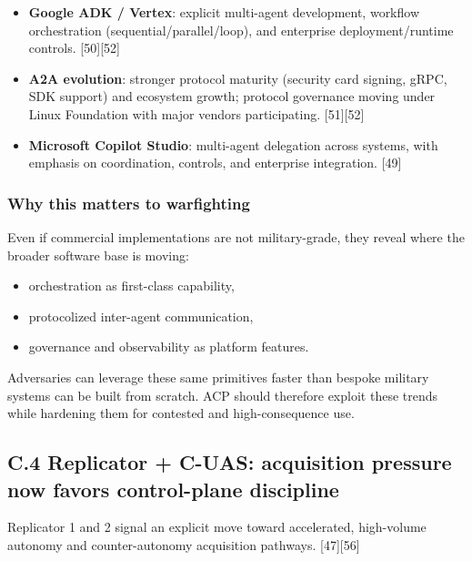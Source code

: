 \documentclass[
]{article}
\providecommand{\tightlist}{%
  \setlength{\itemsep}{0pt}\setlength{\parskip}{0pt}}
\begin{document}
\begin{itemize}
\tightlist
\item
  \textbf{Google ADK / Vertex}: explicit multi-agent development,
  workflow orchestration (sequential/parallel/loop), and enterprise
  deployment/runtime controls. {[}50{]}{[}52{]}
\item
  \textbf{A2A evolution}: stronger protocol maturity (security card
  signing, gRPC, SDK support) and ecosystem growth; protocol governance
  moving under Linux Foundation with major vendors participating.
  {[}51{]}{[}52{]}
\item
  \textbf{Microsoft Copilot Studio}: multi-agent delegation across
  systems, with emphasis on coordination, controls, and enterprise
  integration. {[}49{]}
\end{itemize}

\hypertarget{why-this-matters-to-warfighting}{%
\subsubsection{Why this matters to
warfighting}\label{why-this-matters-to-warfighting}}

Even if commercial implementations are not military-grade, they reveal
where the broader software base is moving:

\begin{itemize}
\tightlist
\item
  orchestration as first-class capability,
\item
  protocolized inter-agent communication,
\item
  governance and observability as platform features.
\end{itemize}

Adversaries can leverage these same primitives faster than bespoke
military systems can be built from scratch. ACP should therefore exploit
these trends while hardening them for contested and high-consequence
use.

\hypertarget{c.4-replicator-c-uas-acquisition-pressure-now-favors-control-plane-discipline}{%
\subsection{C.4 Replicator + C-UAS: acquisition pressure now favors
control-plane
discipline}\label{c.4-replicator-c-uas-acquisition-pressure-now-favors-control-plane-discipline}}

Replicator 1 and 2 signal an explicit move toward accelerated,
high-volume autonomy and counter-autonomy acquisition pathways.
{[}47{]}{[}56{]}
\end{document}
